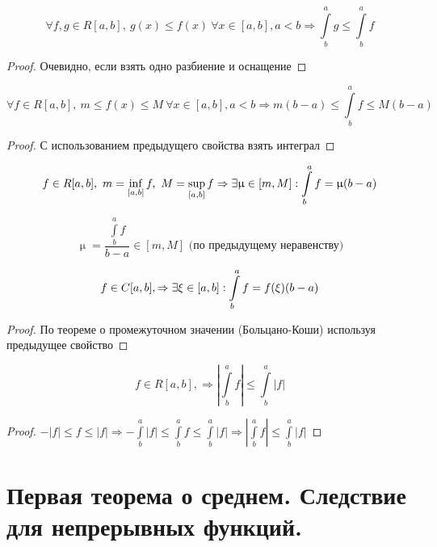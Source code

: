 \documentclass[12pt, fleqn]{article}
\begin{document}
\begin{Property}[3]
\begin{Property}[4]
\begin{Property}[2, аддитивность]
\begin{Property}[4]
    \[\forall f,g \in R[a,b],\ g(x) \leqslant f(x)\ \forall x \in [a,b], a<b \Rightarrow \int\limits^a_b g \leqslant \int\limits^a_b f\]
\end{Property}

\begin{proof}
    Очевидно, если взять одно разбиение и оснащение
\end{proof}

\begin{Property}[5]
    \[\forall f \in R[a,b],\ m \leqslant f(x) \leqslant M\ \forall x \in [a,b], a<b \Rightarrow m(b-a) \leqslant \int\limits^a_b f \leqslant M(b-a)\]
\end{Property}

\begin{proof}
    С использованием предыдущего свойства взять интеграл
\end{proof}

\begin{Property}[6]
    \[f \in R[a,b],\ m = \inf\limits_{[a,b]} f,\ M = \sup\limits_{[a,b]} f \Rightarrow \exists \upmu \in [m,M]: \int\limits^a_b f =\upmu (b-a)\]
\end{Property}

\begin{Proof}
    \[\upmu=\frac{\int\limits^a_b f}{b-a} \in [m,M] \text{ (по предыдущему неравенству)}\]
\end{Proof}

\begin{Property}[7]
    \[f \in C[a,b], \Rightarrow \exists \xi \in [a,b]: \int\limits^a_b f = f(\xi) (b-a)\]
\end{Property}

\begin{proof}
    По теореме о промежуточном значении (Больцано-Коши) используя предыдущее свойство
\end{proof}

\begin{Property}[8]
    \[f \in R[a,b], \Rightarrow |\int\limits^a_b f| \leqslant \int\limits^a_b |f|\]
\end{Property}

\begin{proof}
    $-|f| \leqslant f \leqslant |f| \Rightarrow -\int\limits^a_b |f| \leqslant \int\limits^a_b f \leqslant \int\limits^a_b |f| \Rightarrow |\int\limits^a_b f| \leqslant \int\limits^a_b |f|$
\end{proof}

\newpage
\section{Первая теорема о среднем. Следствие для непрерывных функций.}
 

\end{Property}
\end{Property}
\end{Property}
\end{document}
